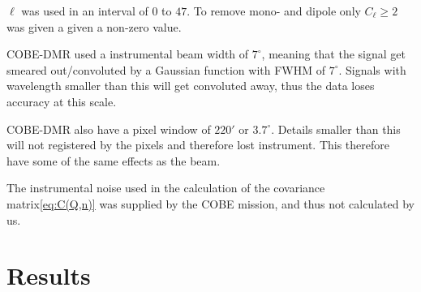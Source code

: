 \documentclass{emulateapj}
\begin{document}
$\ell$ was used in an interval of $0$ to $47$. To remove mono- and dipole only $C_\ell \geq 2$ was given a given a non-zero value.

COBE-DMR used a instrumental beam width of $7^\circ$, meaning that the signal get smeared out/convoluted by a Gaussian function with FWHM of $7^\circ$. Signals with wavelength smaller than this will get convoluted away, thus the data loses accuracy at this scale.

COBE-DMR also have a pixel window of $220'$ or $3.7^\circ$. Details smaller than this will not registered by the pixels and therefore lost instrument. This therefore have some of the same effects as the beam.

The instrumental noise used in the calculation of the covariance matrix\eqref{eq:C(Q,n)} was supplied by the COBE mission, and thus not calculated by us.


%

\section{Results}
\label{sec:results}
\end{document}
